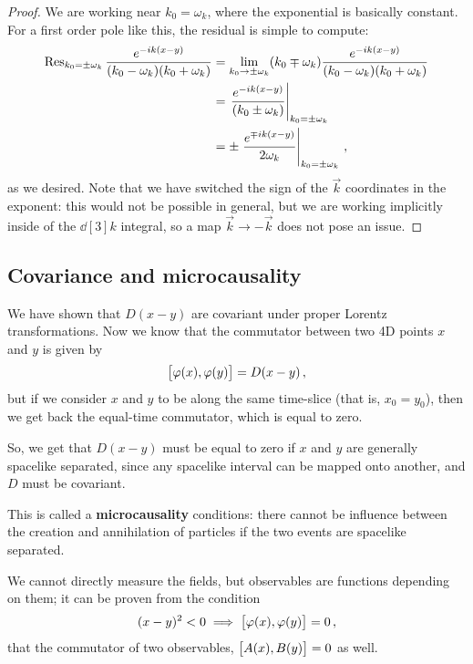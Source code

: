 \documentclass[main.tex]{subfiles}
\begin{document}
\begin{proof}
We are working near \(k_0 = \omega_{k}\), where the exponential is basically constant.
For a first order pole like this, the residual is simple to compute: 
%
\begin{align}
\Res_{k_0 = \pm \omega_{k}} 
\frac{e^{-ik(x-y)}}{(k_0 - \omega_{k}) (k_0 + \omega_{k})}
&= \lim_{k_0 \to \pm \omega_{k}} 
(k_0 \mp \omega_{k})
\frac{e^{-ik(x-y)}}{(k_0 - \omega_{k}) (k_0 + \omega_{k})}  \\
&= \eval{\frac{e^{-ik(x-y)}}{(k_0 \pm \omega_{k})}}_{k_0 = \pm \omega_{k}}  \\
&= \pm \eval{\frac{e^{\mp ik (x-y)}}{2 \omega_{k}}}_{k_0 = \pm \omega_{k}} 
\,,
\end{align}
%
as we desired. Note that we have switched the sign of the \(\vec{k}\) coordinates in the exponent: this would not be possible in general, but we are working implicitly inside of the \(\dd[3]{k} \) integral, so a map \(\vec{k} \to - \vec{k}\) does not pose an issue.
\end{proof}

\subsection{Covariance and microcausality} \label{sec:covariance-microcausality}

We have shown that \(D(x-y)\) are covariant under proper Lorentz transformations. Now we know that the commutator between two 4D points \(x\) and \(y\) is given by 
%
\begin{align}
\qty[\varphi (x), \varphi (y)] = D(x-y)
\,,
\end{align}
%
but if we consider \(x\) and \(y\) to be along the same time-slice (that is, \(x_0 = y_0 \)), then we get back the equal-time commutator, which is equal to zero. 

So, we get that \(D(x-y)\) must be equal to zero if \(x\) and \(y\) are generally spacelike separated, since any spacelike interval can be mapped onto another, and \(D\) must be covariant. 

This is called a \textbf{microcausality} conditions: there cannot be influence between the creation and annihilation of particles if the two events are spacelike separated. 

We cannot directly measure the fields, but observables are functions depending on them; it can be proven from the condition 
%
\begin{align}
(x-y)^2<0 \implies
\qty[\varphi (x), \varphi (y)] = 0
\,,
\end{align}
%
that the commutator of two observables, \(\qty[A(x), B(y)] =0\) as well.
\end{document}
